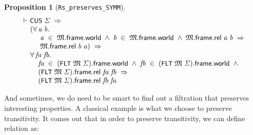 \documentclass[letterpaper]{article}
\newtheorem{prop}{Proposition}
\renewcommand{\HOLConst}[1]{{\textsf{\upshape\small #1}}}
\newenvironment{holmath}{\begin{displaymath}\begin{array}{l}}{\end{array}\end{displaymath}\ignorespacesafterend}
\begin{document}
\begin{prop}[\texttt{Rs_preserves_SYMM}]
\begin{holmath}
  \ensuremath{\HOLTokenTurnstile}\HOLConst{CUS}\;\HOLFreeVar{\ensuremath{\Sigma}}\;\HOLSymConst{\HOLTokenImp{}}\\
\;\;\;\;\;(\HOLSymConst{\HOLTokenForall{}}\HOLBoundVar{a}\;\HOLBoundVar{b}.\\
\;\;\;\;\;\;\;\;\;\;\HOLBoundVar{a}\;\HOLSymConst{\HOLTokenIn{}}\;\HOLFreeVar{\ensuremath{\mathfrak{M}}}.\HOLFieldName{frame}.\HOLFieldName{world}\;\HOLSymConst{\HOLTokenConj{}}\;\HOLBoundVar{b}\;\HOLSymConst{\HOLTokenIn{}}\;\HOLFreeVar{\ensuremath{\mathfrak{M}}}.\HOLFieldName{frame}.\HOLFieldName{world}\;\HOLSymConst{\HOLTokenConj{}}\;\HOLFreeVar{\ensuremath{\mathfrak{M}}}.\HOLFieldName{frame}.\HOLFieldName{rel}\;\HOLBoundVar{a}\;\HOLBoundVar{b}\;\HOLSymConst{\HOLTokenImp{}}\\
\;\;\;\;\;\;\;\;\;\;\HOLFreeVar{\ensuremath{\mathfrak{M}}}.\HOLFieldName{frame}.\HOLFieldName{rel}\;\HOLBoundVar{b}\;\HOLBoundVar{a})\;\HOLSymConst{\HOLTokenImp{}}\\
\;\;\;\;\;\HOLSymConst{\HOLTokenForall{}}\HOLBoundVar{fa}\;\HOLBoundVar{fb}.\\
\;\;\;\;\;\;\;\;\;\HOLBoundVar{fa}\;\HOLSymConst{\HOLTokenIn{}}\;(\HOLConst{FLT}\;\HOLFreeVar{\ensuremath{\mathfrak{M}}}\;\HOLFreeVar{\ensuremath{\Sigma}}).\HOLFieldName{frame}.\HOLFieldName{world}\;\HOLSymConst{\HOLTokenConj{}}\;\HOLBoundVar{fb}\;\HOLSymConst{\HOLTokenIn{}}\;(\HOLConst{FLT}\;\HOLFreeVar{\ensuremath{\mathfrak{M}}}\;\HOLFreeVar{\ensuremath{\Sigma}}).\HOLFieldName{frame}.\HOLFieldName{world}\;\HOLSymConst{\HOLTokenConj{}}\\
\;\;\;\;\;\;\;\;\;(\HOLConst{FLT}\;\HOLFreeVar{\ensuremath{\mathfrak{M}}}\;\HOLFreeVar{\ensuremath{\Sigma}}).\HOLFieldName{frame}.\HOLFieldName{rel}\;\HOLBoundVar{fa}\;\HOLBoundVar{fb}\;\HOLSymConst{\HOLTokenImp{}}\\
\;\;\;\;\;\;\;\;\;(\HOLConst{FLT}\;\HOLFreeVar{\ensuremath{\mathfrak{M}}}\;\HOLFreeVar{\ensuremath{\Sigma}}).\HOLFieldName{frame}.\HOLFieldName{rel}\;\HOLBoundVar{fb}\;\HOLBoundVar{fa}
\end{holmath}
\end{prop}

And sometimes, we do need to be smart to find out a filtration that preserves interesting properties. A classical example is what we choose to preserve transitivity. It comes out that in order to preserve transitivity, we can define relation as:
\end{document}
